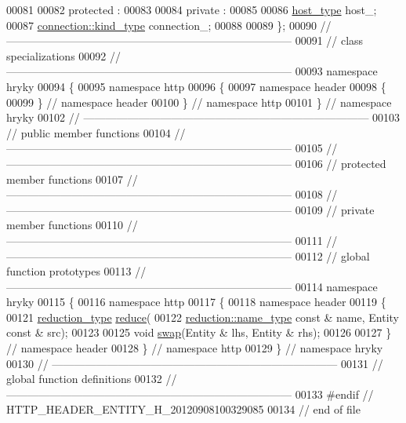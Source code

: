 \begin{DoxyCode}
00081 
00082 \textcolor{keyword}{protected} :
00083 
00084 \textcolor{keyword}{private} :
00085 
00086     \hyperlink{classhryky_1_1uri_1_1authority_1_1_entity}{host_type}               host\_;
00087     \hyperlink{classhryky_1_1_kind}{connection::kind_type}   connection\_;
00088 
00089 \};
00090 \textcolor{comment}{//
      ------------------------------------------------------------------------------}
00091 \textcolor{comment}{// class specializations}
00092 \textcolor{comment}{//
      ------------------------------------------------------------------------------}
00093 \textcolor{keyword}{namespace }hryky
00094 \{
00095 \textcolor{keyword}{namespace }http
00096 \{
00097 \textcolor{keyword}{namespace }header
00098 \{
00099 \} \textcolor{comment}{// namespace header}
00100 \} \textcolor{comment}{// namespace http}
00101 \} \textcolor{comment}{// namespace hryky}
00102 \textcolor{comment}{//
      ------------------------------------------------------------------------------}
00103 \textcolor{comment}{// public member functions}
00104 \textcolor{comment}{//
      ------------------------------------------------------------------------------}
00105 \textcolor{comment}{//
      ------------------------------------------------------------------------------}
00106 \textcolor{comment}{// protected member functions}
00107 \textcolor{comment}{//
      ------------------------------------------------------------------------------}
00108 \textcolor{comment}{//
      ------------------------------------------------------------------------------}
00109 \textcolor{comment}{// private member functions}
00110 \textcolor{comment}{//
      ------------------------------------------------------------------------------}
00111 \textcolor{comment}{//
      ------------------------------------------------------------------------------}
00112 \textcolor{comment}{// global function prototypes}
00113 \textcolor{comment}{//
      ------------------------------------------------------------------------------}
00114 \textcolor{keyword}{namespace }hryky
00115 \{
00116 \textcolor{keyword}{namespace }http
00117 \{
00118 \textcolor{keyword}{namespace }header
00119 \{
00121     \hyperlink{namespacehryky_a343a9a4c36a586be5c2693156200eadc}{reduction_type} \hyperlink{namespacehryky_1_1http_a08fc36a78a8e2908140fcd102829a566}{reduce}(
00122         \hyperlink{namespacehryky_1_1reduction_ac686c30a4c8d196bbd0f05629a6b921f}{reduction::name_type} \textcolor{keyword}{const} & name, Entity \textcolor{keyword}{const} & src);
00123 
00125     \textcolor{keywordtype}{void} \hyperlink{namespacehryky_1_1http_a38e62595ad532d18fbc65ceb61973aec}{swap}(Entity & lhs, Entity & rhs);
00126 
00127 \} \textcolor{comment}{// namespace header}
00128 \} \textcolor{comment}{// namespace http}
00129 \} \textcolor{comment}{// namespace hryky}
00130 \textcolor{comment}{//
      ------------------------------------------------------------------------------}
00131 \textcolor{comment}{// global function definitions}
00132 \textcolor{comment}{//
      ------------------------------------------------------------------------------}
00133 \textcolor{preprocessor}{#endif // HTTP\_HEADER\_ENTITY\_H\_20120908100329085}
00134 \textcolor{preprocessor}{}\textcolor{comment}{// end of file}
\end{DoxyCode}
